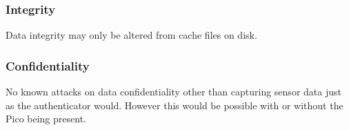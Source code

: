 	
	\subsubsection*{Integrity}
	Data integrity may only be altered from cache files on disk.
	
	\subsubsection*{Confidentiality}
	No known attacks on data confidentiality other than capturing sensor data just as the authenticator would. However this would be possible with or without the Pico being present.
